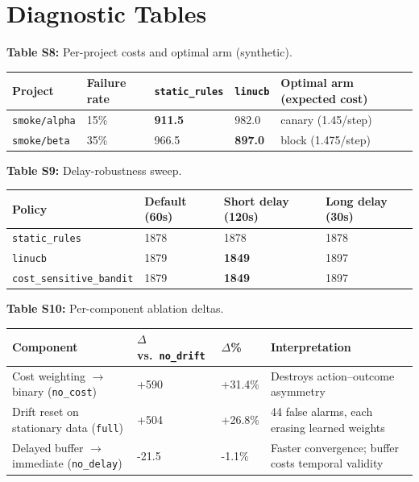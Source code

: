 \documentclass[10pt]{article}
\begin{document}
\section*{Diagnostic Tables}

\noindent\textbf{Table S8:} Per-project costs and optimal arm (synthetic).

\begin{table}[t]\centering\footnotesize\begin{tabular}{lllll}
\toprule\noalign{}
Project
 & Failure rate & \texttt{static\_rules} & \texttt{linucb} & Optimal arm (expected cost)
 \\
\midrule\noalign{}
\bottomrule\noalign{}
\texttt{smoke/alpha} & 15\% & \textbf{911.5} & 982.0 & canary
(1.45/step) \\
\texttt{smoke/beta} & 35\% & 966.5 & \textbf{897.0} & block
(1.475/step) \\
\end{tabular}\end{table}

\noindent\textbf{Table S9:} Delay-robustness sweep.

\begin{table}[t]\centering\footnotesize\begin{tabular}{llll}
\toprule\noalign{}
Policy & Default (60s) & Short delay (120s) & Long delay (30s) \\
\midrule\noalign{}
\bottomrule\noalign{}
\texttt{static\_rules} & 1878 & 1878 & 1878 \\
\texttt{linucb} & 1879 & \textbf{1849} & 1897 \\
\texttt{cost\_sensitive\_bandit} & 1879 & \textbf{1849} & 1897 \\
\end{tabular}\end{table}

\noindent\textbf{Table S10:} Per-component ablation deltas.

\begin{table}[t]\centering\footnotesize\begin{tabular}{llll}
\toprule\noalign{}
Component
 & $\Delta$ vs.~\texttt{no\_drift} & $\Delta$\% & Interpretation
 \\
\midrule\noalign{}
\bottomrule\noalign{}
Cost weighting $\rightarrow$ binary (\texttt{no\_cost}) & +590 & +31.4\% & Destroys
action--outcome asymmetry \\
Drift reset on stationary data (\texttt{full}) & +504 & +26.8\% & 44
false alarms, each erasing learned weights \\
Delayed buffer $\rightarrow$ immediate (\texttt{no\_delay}) & -21.5 & -1.1\% &
Faster convergence; buffer costs temporal validity \\
\end{tabular}\end{table}
\end{document}
